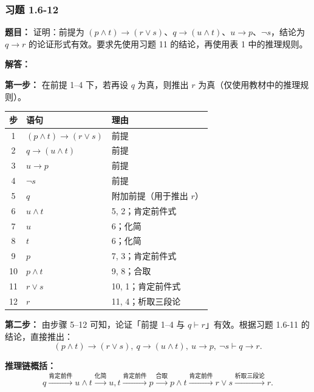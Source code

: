 \documentclass[11pt,UTF8]{article}
\begin{document}
\subsubsection*{习题 1.6-12}
\textbf{题目：} 证明：前提为 $(p \land t) \to (r \lor s)$、$q \to (u \land t)$、$u \to p$、$\neg s$，结论为 $q \to r$ 的论证形式有效。要求先使用习题 11 的结论，再使用表 1 中的推理规则。

\textbf{解答：}

\textbf{第一步：} 在前提 1--4 下，若再设 $q$ 为真，则推出 $r$ 为真（仅使用教材中的推理规则）。

\begin{center}
\begin{tabular}{c|l|l}
\hline
步 & 语句 & 理由 \\
\hline
1 & $(p \land t) \to (r \lor s)$ & 前提 \\
2 & $q \to (u \land t)$ & 前提 \\
3 & $u \to p$ & 前提 \\
4 & $\neg s$ & 前提 \\
5 & $q$ & 附加前提（用于推出 $r$） \\
6 & $u \land t$ & 5, 2；肯定前件式 \\
7 & $u$ & 6；化简 \\
8 & $t$ & 6；化简 \\
9 & $p$ & 7, 3；肯定前件式 \\
10 & $p \land t$ & 9, 8；合取 \\
11 & $r \lor s$ & 10, 1；肯定前件式 \\
12 & $r$ & 11, 4；析取三段论 \\
\hline
\end{tabular}
\end{center}

\textbf{第二步：} 由步骤 5--12 可知，论证「前提 1--4 与 $q \vdash r$」有效。根据习题 1.6-11 的结论，直接推出：
\[ \boxed{(p \land t) \to (r \lor s),\ q \to (u \land t),\ u \to p,\ \neg s \vdash q \to r.} \]

\textbf{推理链概括：}
\[ q \xrightarrow{\text{肯定前件}} u \land t \xrightarrow{\text{化简}} u,t \xrightarrow{\text{肯定前件}} p \xrightarrow{\text{合取}} p \land t \xrightarrow{\text{肯定前件}} r \lor s \xrightarrow{\text{析取三段论}} r. \]
\end{document}

